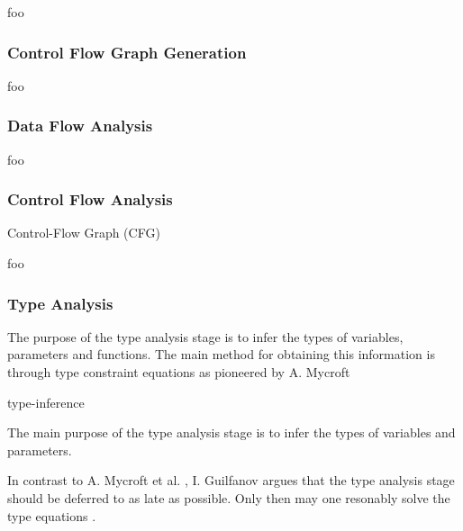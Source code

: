 foo


\subsubsection{Control Flow Graph Generation}

foo


\subsubsection{Data Flow Analysis}

foo

\cite{type_decomp}


\subsubsection{Control Flow Analysis}

Control-Flow Graph (CFG)

foo



\subsubsection{Type Analysis}


The purpose of the type analysis stage is to infer the types of variables, parameters and functions. The main method for obtaining this information is through type constraint equations as pioneered by A. Mycroft

type-inference

The main purpose of the type analysis stage is to infer the types of variables and parameters.




In contrast to A. Mycroft et al. \cite{type_decomp}, I. Guilfanov argues that the type analysis stage should be deferred to as late as possible. Only then may one resonably solve the type equations \cite{hexrays}.

